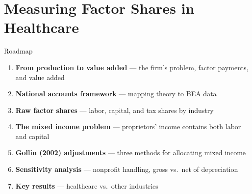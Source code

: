 
\section{Measuring Factor Shares in Healthcare}

\begin{frame}{Roadmap}

\begin{enumerate}
    \item \textbf{From production to value added} --- the firm's problem, factor payments, and value added
    \item \textbf{National accounts framework} --- mapping theory to BEA data
    \item \textbf{Raw factor shares} --- labor, capital, and tax shares by industry
    \item \textbf{The mixed income problem} --- proprietors' income contains both labor and capital
    \item \textbf{Gollin (2002) adjustments} --- three methods for allocating mixed income
    \item \textbf{Sensitivity analysis} --- nonprofit handling, gross vs.\ net of depreciation
    \item \textbf{Key results} --- healthcare vs.\ other industries
\end{enumerate}

\end{frame}

